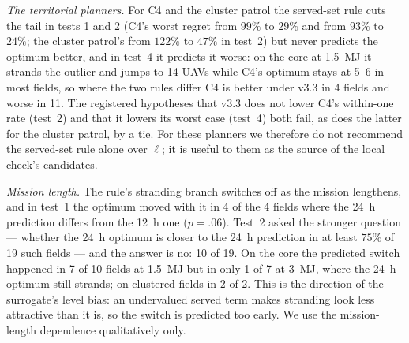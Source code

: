 \documentclass[journal,outdir=./]{IEEEtran}
\begin{document}
\textit{The territorial planners.} For C4 and the cluster patrol the served-set rule cuts the tail in tests 1 and 2 (C4's worst regret from $99\%$ to $29\%$ and from $93\%$ to $24\%$; the cluster patrol's from $122\%$ to $47\%$ in test~2) but never predicts the optimum better, and in test~4 it predicts it worse: on the core at 1.5~MJ it strands the outlier and jumps to 14 UAVs while C4's optimum stays at 5--6 in most fields, so where the two rules differ C4 is better under v3.3 in 4 fields and worse in 11. The registered hypotheses that v3.3 does not lower C4's within-one rate (test~2) and that it lowers its worst case (test~4) both fail, as does the latter for the cluster patrol, by a tie. For these planners we therefore do not recommend the served-set rule alone over $\ell$; it is useful to them as the source of the local check's candidates.

\textit{Mission length.} The rule's stranding branch switches off as the mission lengthens, and in test~1 the optimum moved with it in 4 of the 4 fields where the 24~h prediction differs from the 12~h one ($p=.06$). Test~2 asked the stronger question --- whether the 24~h optimum is closer to the 24~h prediction in at least $75\%$ of 19 such fields --- and the answer is no: 10 of 19. On the core the predicted switch happened in 7 of 10 fields at 1.5~MJ but in only 1 of 7 at 3~MJ, where the 24~h optimum still strands; on clustered fields in 2 of 2. This is the direction of the surrogate's level bias: an undervalued served term makes stranding look less attractive than it is, so the switch is predicted too early. We use the mission-length dependence qualitatively only.

\begin{table}[t]\centering
\footnotesize\setlength{\tabcolsep}{3pt}
\caption{Fourth registered test: the local check of Result~\ref{res:served} against the rule alone, 160 fresh fields per planner (seeds 50--57). Regret in \%; exact: the check finds the swept optimum. Thresholds were registered before the run; the cluster patrol misses its mean-regret threshold ($<1\%$).}
\label{tab:localcheck}
\end{table}
\end{document}
